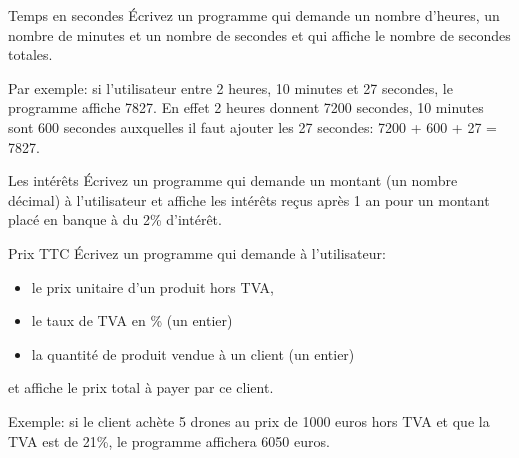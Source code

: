 \documentclass[a4paper,11pt]{style-esi/td}
\begin{document}
\begin{Exercice}{Temps en secondes}
	\'Ecrivez un programme qui demande
	un nombre d'heures, un nombre de minutes et un nombre de secondes
	et qui affiche le nombre de secondes totales.

	Par exemple: si l'utilisateur entre 2 heures, 10 minutes et 27 secondes, le
	programme affiche
	7827. En effet 2 heures donnent 7200 secondes, 10 minutes sont 600 secondes
	auxquelles il faut ajouter les 27 secondes: 7200 + 600 + 27 = 7827.
\end{Exercice}


\begin{Exercice}{Les intérêts}
	\'Ecrivez un programme qui demande un montant (un nombre décimal)
	à l'utilisateur et affiche les intérêts reçus après 1 an pour un montant placé
	en banque à du 2\% d'intérêt.
\end{Exercice}

\begin{Exercice}{Prix TTC}
	\'Ecrivez un programme qui demande à l'utilisateur:
	\begin{itemize}
		\item le prix unitaire d’un produit hors TVA,
		\item le taux de TVA en \% (un entier)
		\item la quantité de produit vendue à un client (un entier)
	\end{itemize}
	et affiche le prix total à payer par ce client.

	Exemple: si le client achète 5 drones au prix de 1000 euros hors TVA et que la
	TVA est de 21\%, le programme affichera 6050 euros.
\end{Exercice}
\end{document}
